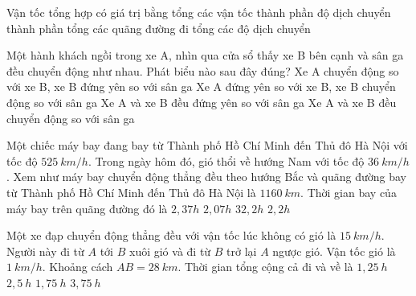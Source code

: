 \begin{ex}%
Vận tốc tổng hợp có giá trị bằng
\choice
{\True tổng các vận tốc thành phần}
{độ dịch chuyển thành phần}
{tổng các quãng đường đi}
{tổng các độ dịch chuyển}
\loigiai{
}
 \end{ex}	
\begin{ex}%
Một hành khách ngồi trong xe A, nhìn qua cửa sổ thấy xe B bên cạnh và sân ga đều chuyển động như nhau. Phát biểu nào sau đây đúng?
\choice
{\True Xe A chuyển động so với xe B, xe B đứng yên so với sân ga}
{Xe A đứng yên so với xe B, xe B chuyển động so với sân ga}
{Xe A và xe B đều đứng yên so với sân ga}
{Xe A và xe B đều chuyển động so với sân ga}

 \end{ex}	
\begin{ex}%
Một chiếc máy bay đang bay từ Thành phố Hồ Chí Minh đến Thủ đô Hà Nội với tốc độ $525\ km/h$. Trong ngày hôm đó, gió thổi về hướng Nam với tốc độ $36\ km/h$. Xem như máy bay chuyển động thẳng đều theo hướng Bắc và quãng đường bay từ Thành phố Hồ Chí Minh đến Thủ đô Hà Nội là $1160\ km$. Thời gian bay của máy bay trên quãng đường đó là
\choice
{\True $2,37h$}
{$2,07h$}
{$32,2h$}
{$2,2h$}
\end{ex}	
\begin{ex}%
Một xe đạp chuyển động thẳng đều với vận tốc lúc không có gió là $15\ km/h$. Người này đi từ $A$ tới $B$ xuôi gió và đi từ $B$ trở lại $A$ ngược gió. Vận tốc gió là $1\ km/h$. Khoảng cách $AB = 28\ km$. Thời gian tổng cộng cả đi và về là
\choice
{$1,25\ h$}
{$2,5\ h$}
{$1,75\ h$}
{\True $3,75\ h$}	
\end{ex}	
